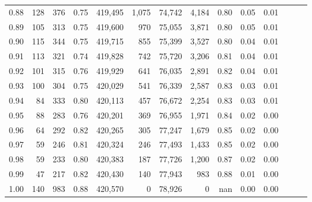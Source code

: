 \begin{tabular}{rrrrrrrrrrrrrr}
0.88 &     128 &    376 &  0.75 &  419,495 &    1,075 &  74,742 &   4,184 &  0.80 &  0.05 &      0.01 \\
0.89 &     105 &    313 &  0.75 &  419,600 &      970 &  75,055 &   3,871 &  0.80 &  0.05 &      0.01 \\
0.90 &     115 &    344 &  0.75 &  419,715 &      855 &  75,399 &   3,527 &  0.80 &  0.04 &      0.01 \\
0.91 &     113 &    321 &  0.74 &  419,828 &      742 &  75,720 &   3,206 &  0.81 &  0.04 &      0.01 \\
0.92 &     101 &    315 &  0.76 &  419,929 &      641 &  76,035 &   2,891 &  0.82 &  0.04 &      0.01 \\
0.93 &     100 &    304 &  0.75 &  420,029 &      541 &  76,339 &   2,587 &  0.83 &  0.03 &      0.01 \\
0.94 &      84 &    333 &  0.80 &  420,113 &      457 &  76,672 &   2,254 &  0.83 &  0.03 &      0.01 \\
0.95 &      88 &    283 &  0.76 &  420,201 &      369 &  76,955 &   1,971 &  0.84 &  0.02 &      0.00 \\
0.96 &      64 &    292 &  0.82 &  420,265 &      305 &  77,247 &   1,679 &  0.85 &  0.02 &      0.00 \\
0.97 &      59 &    246 &  0.81 &  420,324 &      246 &  77,493 &   1,433 &  0.85 &  0.02 &      0.00 \\
0.98 &      59 &    233 &  0.80 &  420,383 &      187 &  77,726 &   1,200 &  0.87 &  0.02 &      0.00 \\
0.99 &      47 &    217 &  0.82 &  420,430 &      140 &  77,943 &     983 &  0.88 &  0.01 &      0.00 \\
1.00 &     140 &    983 &  0.88 &  420,570 &        0 &  78,926 &       0 &   nan &  0.00 &      0.00 \\
\bottomrule
\end{tabular}
